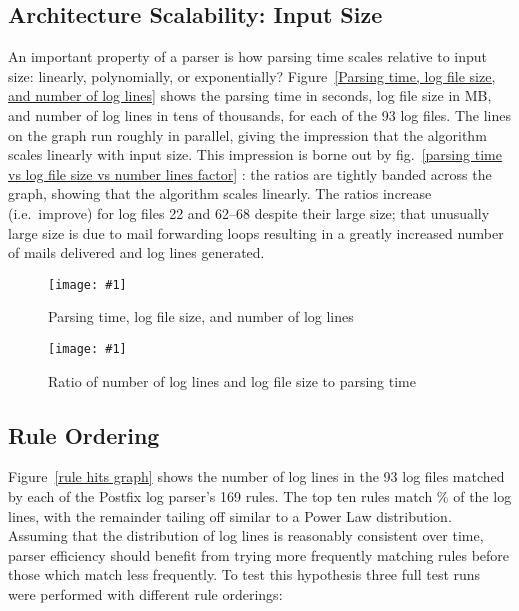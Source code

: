 \documentclass[preprint,draft,numbers,1p]{elsarticle}
\newcommand{\showgraph}[3]{%
    \begin{figure}[btp]%
        \texttt{[image: \#1]}%
        \caption{#2}\label{#3}%
    \end{figure}%
}
\newcommand{\refwithlabel}[2]{%
    #1~\vref{#2}%
}
\newcommand{\graphref}[1]{%
    \refwithlabel{fig.}{#1}%
}
\newcommand{\Graphref}[1]{%
    \refwithlabel{Figure}{#1}%
}
\newcommand{\numberOFlogFILES}[0]{%
    93%
}
\newcommand{\numberOFrules}[0]{%
    169%
}
\begin{document}
\subsection{Architecture Scalability: Input Size}

An important property of a parser is how parsing time scales relative to
input size: linearly, polynomially, or exponentially?  \Graphref{Parsing
time, log file size, and number of log lines} shows the parsing time in
seconds, log file size in MB, and number of log lines in tens of thousands,
for each of the \numberOFlogFILES{} log files.  The lines on the graph run
roughly in parallel, giving the impression that the algorithm scales
linearly with input size.  This impression is borne out by
\graphref{parsing time vs log file size vs number lines factor}: the ratios
are tightly banded across the graph, showing that the algorithm scales
linearly.  The ratios increase (i.e.\ improve) for log files 22 and 62--68
despite their large size; that unusually large size is due to mail
forwarding loops resulting in a greatly increased number of mails delivered
and log lines generated.

\showgraph{build/graph-input-size-vs-parsing-time}{Parsing time, log file
size, and number of log lines}{Parsing time, log file size, and number of
log lines} \showgraph{build/graph-input-size-vs-parsing-time-ratio}{Ratio
of number of log lines and log file size to parsing time}{parsing time vs
log file size vs number lines factor}

\subsection{Rule Ordering}

\label{Rule ordering}

\Graphref{rule hits graph} shows the number of log lines in the
\numberOFlogFILES{} log files matched by each of the Postfix log parser's
\numberOFrules{} rules.  The top ten rules match
\% of the log lines, with the remainder
tailing off similar to a Power Law distribution.  Assuming that the
distribution of log lines is reasonably consistent over time, parser
efficiency should benefit from trying more frequently matching rules before
those which match less frequently.  To test this hypothesis three full test
runs were performed with different rule orderings:
\end{document}
